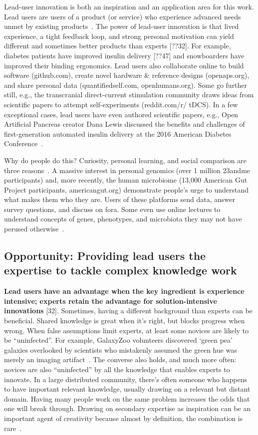 
Lead-user innovation is both an inspiration and an application area for this work. Lead users are
users of a product (or service) who experience advanced needs unmet by existing products~\cite{VonHippel2005}. The
power of lead-user innovation is that lived experience, a tight feedback loop, and strong personal
motivation can yield different and sometimes better products than experts [??32]. For example, diabetes
patients have improved insulin delivery [??47] and snowboarders have improved their binding
ergonomics. Lead users also collaborate online to build software
(github.com), create novel hardware \& reference designs
(openaps.org), and share personal data (quantifiedself.com,
openhumans.org). Some go further still, e.g., the transcranial
direct-current stimulation community draws ideas from scientific
papers to attempt self-experiments (reddit.com/r/
tDCS). In a few exceptional cases, lead users have even authored
scientific papers, e.g., Open Artificial Pancreas creator
Dana Lewis discussed the benefits and challenges of first-generation
automated insulin delivery at the 2016 American
Diabetes Conference~\cite{DanaLewis}.

Why do people do this? Curiosity, personal learning, and social
comparison are three reasons~\cite{Reinecke2015}. A massive interest in
personal genomics (over 1 million 23andme participants)
and, more recently, the human microbiome (13,000 American
Gut Project participants, americangut.org) demonstrate
people’s urge to understand what makes them who they are.
Users of these platforms send data, answer survey questions,
and discuss on fora. Some even use online lectures to understand
concepts of genes, phenotypes, and microbiota they
may not have perused otherwise~\cite{23andMe2017, Knight2016}. 

\subsection{Opportunity: Providing lead users the expertise to tackle complex knowledge work}
\textbf{Lead users have an advantage when the key ingredient is experience intensive; experts retain the
advantage for solution-intensive innovations} [32].  Sometimes, having a different background than experts can be beneficial. Shared knowledge is great when it’s right, but blocks progress when wrong. When false assumptions limit experts, at least some novices are likely to be “uninfected”. For example, GalaxyZoo volunteers discovered ‘green pea’ galaxies overlooked by scientists who mistakenly assumed the green hue was merely an imaging artifact~\cite{Tinati2015}. The converse also holds, and much more often: novices are also “uninfected” by all the knowledge that enables experts to innovate. In a large distributed community, there’s often someone who happens to have important relevant knowledge, usually drawing on a relevant but distant domain. Having many people work on the same problem increases the odds that one will break through. Drawing on secondary expertise as inspiration can be an important agent of creativity because almost by definition, the combination is rare~\cite{Boden2004}. 

